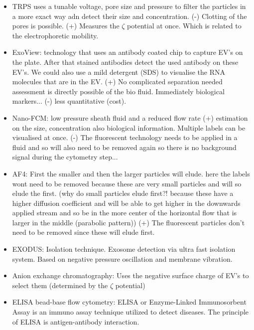 \documentclass{article}
\begin{document}
\begin{itemize}
    
    \item TRPS uses a tunable voltage, pore size and pressure to filter the particles in a more exact way adn detect their size and concentration. (-) Clotting of the pores is possible. (+) Measures the $\zeta$ potential at once. Which is related to the electrophoretic mobility.
    
    \item ExoView: technology that uses an antibody coated chip to capture EV's on the plate. After that stained antibodies detect the used antibody on these EV's. We could also use a mild detergent (SDS) to visualise the RNA molecules that are in the EV.
    (+) No complicated separation needed assessment is directly possible of the bio fluid. Immediately biological markers... (-) less quantitative (cost).
    
    \item Nano-FCM: low pressure sheath fluid and a reduced flow rate
    (+) estimation on the size, concentration also biological information. Multiple labels can be visualised at once. (-) The fluorescent technology needs to be applied in a fluid and so will also need to be removed again so there is no background signal during the cytometry step...
    
    \item AF4: First the smaller and then the larger particles will elude.
    here the labels wont need to be removed because these are very small particles and will so elude the first. (why do small particles elude first?! because these have a higher diffusion coefficient and will be able to get higher in the downwards applied stream and so be in the more center of the horizontal flow that is larger in the middle (parabolic pattern)) (+) The fluorescent particles don't need to be removed since these will elude first.
    
    \item EXODUS: Isolation technique. Exosome detection via ultra fast isolation system. Based on negative pressure oscillation and membrane vibration.
    
    \item Anion exchange chromatography: Uses the negative surface charge of EV's to select them (determined by the $\zeta$ potential)
    
    \item ELISA bead-base flow cytometry:
    ELISA or Enzyme-Linked Immunosorbent Assay is an immuno assay technique utilized to detect diseases. The principle of ELISA is antigen-antibody interaction.
    

\end{itemize}
\end{document}
